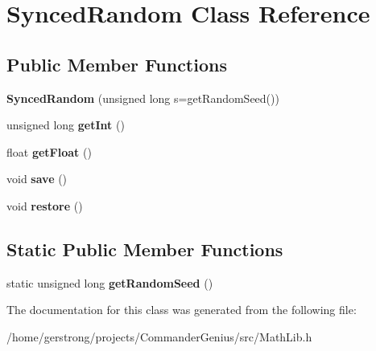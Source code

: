 \hypertarget{class_synced_random}{
\section{SyncedRandom Class Reference}
\label{class_synced_random}
}
\subsection*{Public Member Functions}
\begin{DoxyCompactItemize}
\item 
\hypertarget{class_synced_random_a8f6b50c39ce2c3f06dba5496e556c8f4}{
{\bfseries SyncedRandom} (unsigned long s=getRandomSeed())}
\label{class_synced_random_a8f6b50c39ce2c3f06dba5496e556c8f4}

\item 
\hypertarget{class_synced_random_ab65e31563ac758905427ff0dc36c8d74}{
unsigned long {\bfseries getInt} ()}
\label{class_synced_random_ab65e31563ac758905427ff0dc36c8d74}

\item 
\hypertarget{class_synced_random_af15ff0ba9df0ff8b4cbdaba7ee2e0732}{
float {\bfseries getFloat} ()}
\label{class_synced_random_af15ff0ba9df0ff8b4cbdaba7ee2e0732}

\item 
\hypertarget{class_synced_random_a2345b742d9da1904d4bde255379ec012}{
void {\bfseries save} ()}
\label{class_synced_random_a2345b742d9da1904d4bde255379ec012}

\item 
\hypertarget{class_synced_random_a383fa69921dd43466e5c7832d4e10ca2}{
void {\bfseries restore} ()}
\label{class_synced_random_a383fa69921dd43466e5c7832d4e10ca2}

\end{DoxyCompactItemize}
\subsection*{Static Public Member Functions}
\begin{DoxyCompactItemize}
\item 
\hypertarget{class_synced_random_a4efbf288bbf029536cae22afe5b93b9f}{
static unsigned long {\bfseries getRandomSeed} ()}
\label{class_synced_random_a4efbf288bbf029536cae22afe5b93b9f}

\end{DoxyCompactItemize}


The documentation for this class was generated from the following file:\begin{DoxyCompactItemize}
\item 
/home/gerstrong/projects/CommanderGenius/src/MathLib.h\end{DoxyCompactItemize}
